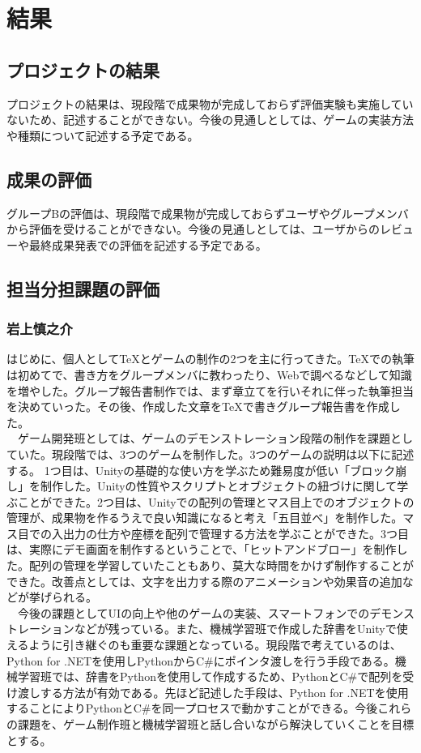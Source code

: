 \chapter{結果}
\section{プロジェクトの結果}
プロジェクトの結果は、現段階で成果物が完成しておらず評価実験も実施していないため、記述することができない。今後の見通しとしては、ゲームの実装方法や種類について記述する予定である。

\section{成果の評価}
グループBの評価は、現段階で成果物が完成しておらずユーザやグループメンバから評価を受けることができない。今後の見通しとしては、ユーザからのレビューや最終成果発表での評価を記述する予定である。


\newpage
\section{担当分担課題の評価}
\subsection{岩上慎之介}
はじめに、個人としてTeXとゲームの制作の2つを主に行ってきた。TeXでの執筆は初めてで、書き方をグループメンバに教わったり、Webで調べるなどして知識を増やした。グループ報告書制作では、まず章立てを行いそれに伴った執筆担当を決めていった。その後、作成した文章をTeXで書きグループ報告書を作成した。\\
　ゲーム開発班としては、ゲームのデモンストレーション段階の制作を課題としていた。現段階では、3つのゲームを制作した。3つのゲームの説明は以下に記述する。
1つ目は、Unityの基礎的な使い方を学ぶため難易度が低い「ブロック崩し」を制作した。Unityの性質やスクリプトとオブジェクトの紐づけに関して学ぶことができた。2つ目は、Unityでの配列の管理とマス目上でのオブジェクトの管理が、成果物を作るうえで良い知識になると考え「五目並べ」を制作した。マス目での入出力の仕方や座標を配列で管理する方法を学ぶことができた。3つ目は、実際にデモ画面を制作するということで、「ヒットアンドブロー」を制作した。配列の管理を学習していたこともあり、莫大な時間をかけず制作することができた。改善点としては、文字を出力する際のアニメーションや効果音の追加などが挙げられる。\\
　今後の課題としてUIの向上や他のゲームの実装、スマートフォンでのデモンストレーションなどが残っている。また、機械学習班で作成した辞書をUnityで使えるように引き継ぐのも重要な課題となっている。現段階で考えているのは、Python for .NETを使用しPythonからC\#にポインタ渡しを行う手段である。機械学習班では、辞書をPythonを使用して作成するため、PythonとC\#で配列を受け渡しする方法が有効である。先ほど記述した手段は、Python for .NETを使用することによりPythonとC\#を同一プロセスで動かすことができる。今後これらの課題を、ゲーム制作班と機械学習班と話し合いながら解決していくことを目標とする。

